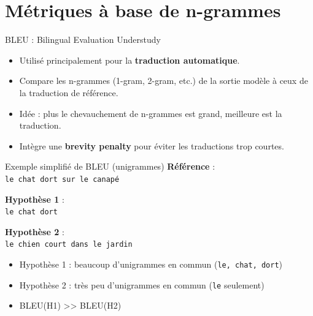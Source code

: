 \documentclass[10pt]{beamer}
\begin{document}
\section{Métriques à base de n-grammes}

\begin{frame}{BLEU : Bilingual Evaluation Understudy}
  \begin{itemize}
    \item Utilisé principalement pour la \textbf{traduction automatique}.
    \item Compare les n-grammes (1-gram, 2-gram, etc.) de la sortie modèle à ceux de la traduction de référence.
    \item Idée : plus le chevauchement de n-grammes est grand, meilleure est la traduction.
    \item Intègre une \textbf{brevity penalty} pour éviter les traductions trop courtes.
  \end{itemize}
\end{frame}

\begin{frame}{Exemple simplifié de BLEU (unigrammes)}
  \textbf{Référence} : \\
  \texttt{le chat dort sur le canapé}

  \vspace{0.2cm}
  \textbf{Hypothèse 1} : \\
  \texttt{le chat dort}

  \vspace{0.2cm}
  \textbf{Hypothèse 2} : \\
  \texttt{le chien court dans le jardin}

  \vspace{0.3cm}
  \begin{itemize}
    \item Hypothèse 1 : beaucoup d'unigrammes en commun (\texttt{le, chat, dort})
    \item Hypothèse 2 : très peu d'unigrammes en commun (\texttt{le} seulement)
    \item BLEU(H1) >> BLEU(H2)
  \end{itemize}
\end{frame}
\end{document}
